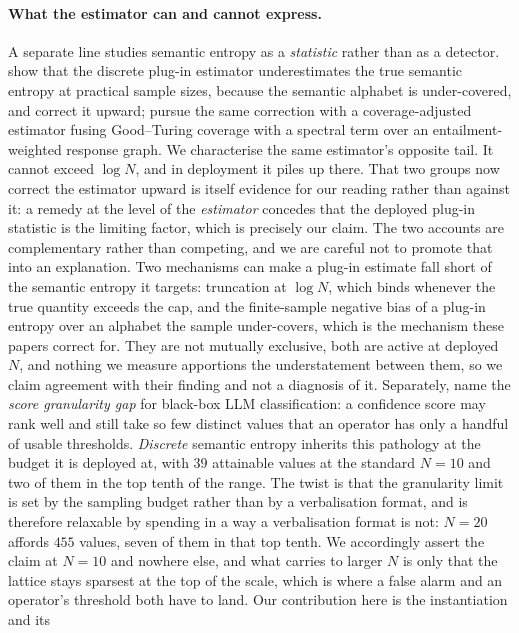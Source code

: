\paragraph{What the estimator can and cannot express.}
A separate line studies semantic entropy as a \emph{statistic} rather than as a detector.
\citet{mccabe2025alphabet} show that the discrete plug-in estimator underestimates the true
semantic entropy at practical sample sizes, because the semantic alphabet is under-covered,
and correct it upward; \citet{pan2026shade} pursue the same correction with a
coverage-adjusted estimator fusing Good--Turing coverage with a spectral term over an
entailment-weighted response graph. We characterise the same estimator's opposite tail. It
cannot exceed $\log N$, and in deployment it piles up there. That two groups now correct the
estimator upward is itself evidence for our reading rather than against it: a remedy at the
level of the \emph{estimator} concedes that the deployed plug-in statistic is the limiting
factor, which is precisely our claim. The two accounts are complementary rather than
competing, and we are careful not to promote that into an explanation. Two mechanisms can
make a plug-in estimate fall short of the semantic entropy it targets: truncation at
$\log N$, which binds whenever the true quantity exceeds the cap, and the finite-sample
negative bias of a plug-in entropy over an alphabet the sample under-covers, which is the
mechanism these papers correct for. They are not mutually exclusive, both are
active at deployed $N$, and nothing we measure apportions the understatement between them,
so we claim agreement with their finding and not a diagnosis of it.
Separately, \citet{sun2026granularity} name the \emph{score granularity
gap} for black-box LLM classification: a confidence score may rank well and still take so
few distinct values that an operator has only a handful of usable thresholds. \emph{Discrete}
semantic entropy inherits this pathology at the budget it is deployed at, with $39$
attainable values at the standard $N{=}10$ and two of them in the top tenth of the range.
The twist is that the granularity limit is set by the sampling budget rather than by a
verbalisation format, and is therefore relaxable by spending in a way a verbalisation format
is not: $N{=}20$ affords $455$ values, seven of them in that top tenth. We accordingly assert
the claim at $N{=}10$ and nowhere else, and what carries to larger $N$ is only that the
lattice stays sparsest at the top of the scale, which is where a false alarm and an
operator's threshold both have to land. Our contribution here is the instantiation and its
